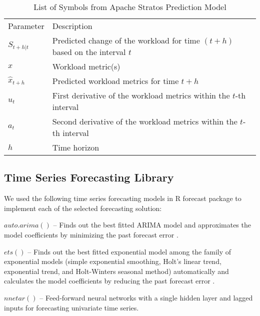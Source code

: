 \begin{table}[]
\centering
\caption{List of Symbols from Apache Stratos Prediction Model}
\begin{tabular}{ll}
Parameter       & Description                                                                     \\
$S_{t+h|t}$     & Predicted change of the workload for time $(t+h)$ based on the interval $t$ \\
$x$             & Workload metric(s)                                                                \\
$\hat{x}_{t+h}$ & Predicted workload metrics for time $t+h$                                       \\
$u_{t}$         & First derivative of the workload metrics within the $t$-th interval           \\
$a_{t}$         & Second derivative of the workload metrics within the $t$-th interval          \\
$h$             & Time horizon                    
\end{tabular}
\end{table}

\subsection{Time Series Forecasting Library}

We used the following time series forecasting models in R forecast package \cite{forecastPackage} to implement each of the selected forecasting solution:

$auto.arima()$ -- Finds out the best fitted ARIMA model and approximates the model coefficients by minimizing the past forecast error \cite{Forecasting_OTexts}.

$ets()$ -- Finds out the best fitted exponential model among the family of exponential models (simple exponential smoothing, Holt's linear trend, exponential trend, and Holt-Winters seasonal method) automatically and calculates the model coefficients by reducing the past forecast error \cite{Forecasting_OTexts}.

$nnetar()$ -- Feed-forward neural networks with a single hidden layer and lagged inputs for forecasting univariate time series.